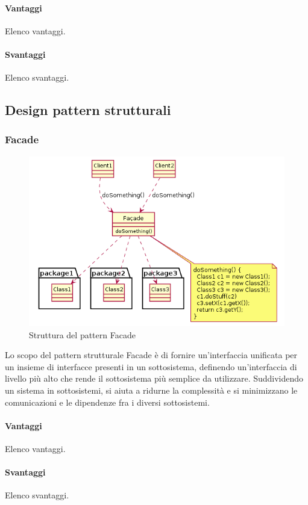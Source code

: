 \documentclass[../SpecificaTecnica.tex]{subfiles}
\begin{document}
			\paragraph{Vantaggi}
				Elenco vantaggi.
			\paragraph{Svantaggi}
				Elenco svantaggi.
	\subsection{Design pattern strutturali}
		\subsubsection{Facade}
			\begin{figure}[!h]
				\centering
				\includegraphics[scale=0.7]{pattern/facade}
				\caption{Struttura del pattern Facade}
				\label{fig:Struttura_Facade}
			\end{figure}		
		
			Lo scopo del pattern strutturale Facade è di fornire un'interfaccia unificata per un insieme di interfacce presenti in un sottosistema, definendo un'interfaccia di livello più alto che rende il sottosistema più semplice da utilizzare. Suddividendo un sistema in sottosistemi, si aiuta a ridurne la complessità e si minimizzano le comunicazioni e le dipendenze fra i diversi sottosistemi.
			\paragraph{Vantaggi}
				Elenco vantaggi.
			\paragraph{Svantaggi}
				Elenco svantaggi.
\end{document}
